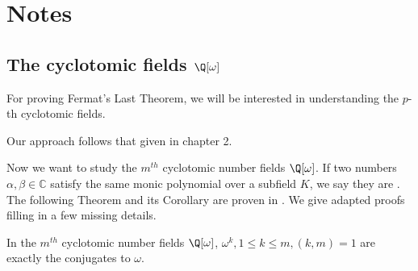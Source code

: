

\section{Notes}

\subsection{The cyclotomic fields $\Q[\omega]$}
For proving Fermat's Last Theorem, we will be interested in understanding the $p$-th cyclotomic fields. 

 Our approach follows that given in \cite{NumberFields} chapter 2.

Now we want to study the $m^{th}$ cyclotomic number fields $\Q[\omega]$. If two numbers $\alpha,\beta\in \mathbb{C}$ satisfy the same monic polynomial over a subfield $K$, we say they are . The following Theorem and its Corollary are proven in \cite{NumberFields}. We give adapted proofs filling in a few missing details.
\begin{theorem}\label{conjugates-of-Q[w]}
In the $m^{th}$ cyclotomic number fields $\Q[\omega]$, $\omega^k, 1\leq k\leq m, (k,m)=1$ are exactly the conjugates to $\omega$. 
\end{theorem}
